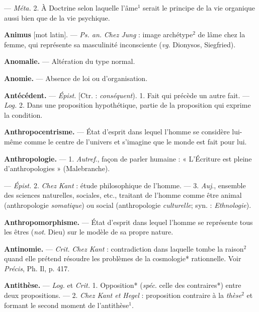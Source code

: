 \begin{itemize}[leftmargin=1cm, label=, itemsep=1pt]
{{{{— \textsf{\textit {Méta.}} 2. À Doctrine selon laquelle l’âme$^1$ serait le principe de
la vie organique aussi bien que de
la vie psychique.

\item {\bf Animus} [mot latin]. — \textsf{\textit {Ps. an.}} {\it Chez
Jung} : image archétype$^2$ de lâme
chez la femme, qui représente sa
masculinité inconsciente ({\it vg}. Dionysos, Siegfried).

\item {\bf Anomalie.} — Altération du type
normal.

\item {\bf Anomie.} — Absence de loi ou d’organisation.

\item {\bf Antécédent.} — \textsf{\textit {Épist.}} [Ctr. : {\it conséquent}). 1. Fait qui précède un autre
fait. — \textsf{\textit {Log.}} 2. Dans une proposition
hypothétique, partie de la proposition qui exprime la condition.

\item {\bf Anthropocentrisme.} — État d'esprit
dans lequel l'homme se considère
lui-même comme le centre de l’univers et s’imagine que le monde est
fait pour lui.

\item {\bf Anthropologie.} — 1. {\it Autref}., façon de
parler humaine : « L’Écriture est
pleine d’anthropologies » (Malebranche).

— \textsf{\textit {Épist.}} 2. {\it Chez Kant} : étude
philosophique de l'homme. — 3.
{\it Auj}., ensemble des sciences naturelles, sociales, etc., traitant de
l’homme comme être animal (anthropologie {\it somatique})
ou social (anthropologie {\it culturelle}; syn. : {\it Ethnologie}).

\item {\bf Anthropomorphisme.} — État d'esprit
dans lequel l'homme se représente
tous les êtres ({\it not}. Dieu) sur le
modèle de sa propre nature.

\item {\bf Antinomie.} — \textsf{\textit {Crit.}} {\it Chez Kant} : contradiction
dans laquelle tombe la
raison$^2$ quand elle prétend résoudre
les problèmes de la cosmologie*
rationnelle. Voir {\it Précis}, Ph. Il,
p. 417.

\item {\bf Antithèse.} — \textsf{\textit {Log.}} et \textsf{\textit {Crit.}} 1. Opposition*
({\it spéc}. celle des contraires*) entre
deux propositions. — 2. {\it Chez Kant
et Hegel} : proposition contraire à la
{\it thèse}$^2$ et formant le second moment
de l’antithèse$^1$.

}}}}
\end{itemize}

